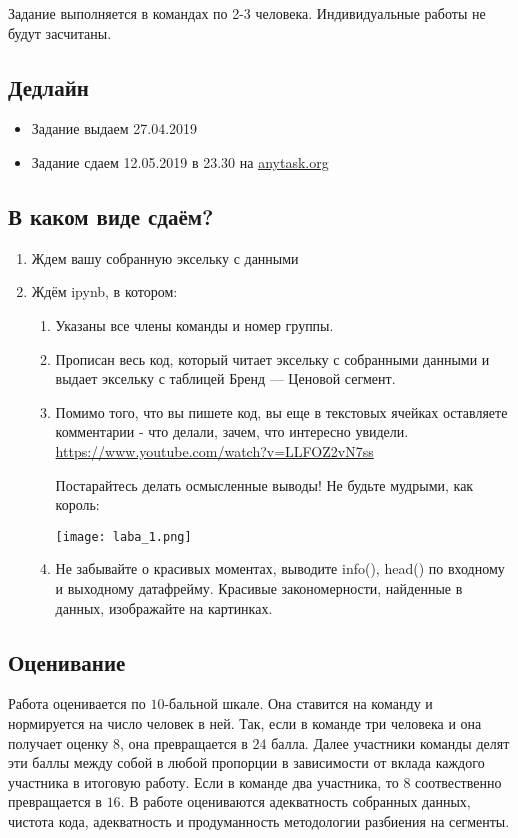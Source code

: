 \documentclass[12pt, a4paper, oneside]{article}
\begin{document}
Задание  выполняется в командах по 2-3 человека. Индивидуальные работы не будут засчитаны.

\subsection*{Дедлайн}

\begin{itemize}
\item Задание выдаем 27.04.2019
\item Задание сдаем 12.05.2019 в 23.30 на \url{anytask.org}
\end{itemize} 

\subsection*{В каком виде сдаём?} 

\begin{enumerate}
	\item  Ждем вашу собранную эксельку с данными
	\item  Ждём ipynb, в котором: 
	\begin{enumerate}
		\item Указаны все члены команды и номер группы.
		\item Прописан весь код, который читает эксельку с собранными данными и выдает эксельку с таблицей Бренд --- Ценовой сегмент.
		\item Помимо того, что вы пишете код, вы еще в текстовых ячейках оставляете комментарии - что делали, зачем, что интересно увидели. \url{https://www.youtube.com/watch?v=LLFOZ2vN7ss} 
		
		Постарайтесь делать осмысленные выводы! Не будьте мудрыми, как король: 
		
		\begin{center}
			\texttt{[image: laba\_1.png]}
		\end{center}
		
		\item Не забывайте о красивых моментах, выводите info(), head() по входному и выходному датафрейму. Красивые закономерности, найденные в данных, изображайте на картинках. 
	\end{enumerate}
\end{enumerate}

\subsection*{Оценивание}

Работа оценивается по $10$-бальной шкале.  Она ставится на команду и нормируется на число человек в ней. Так, если в команде три человека и она получает оценку $8$, она превращается в $24$ балла. Далее участники команды делят эти баллы между собой в любой пропорции в зависимости от вклада каждого участника в итоговую работу. Если в команде два участника, то $8$ соотвественно превращается в $16$.  В работе оцениваются адекватность собранных данных, чистота кода, адекватность и продуманность методологии разбиения на сегменты. 
\end{document}

